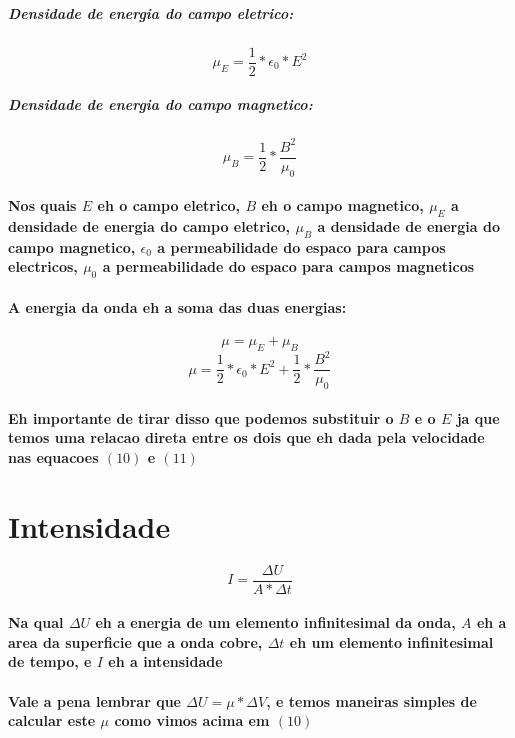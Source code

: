 \documentclass[12pt,twoside, a4paper, twocolumn]{article}
\begin{document}
\subparagraph*{Densidade de energia do campo eletrico:}
\begin{equation}
    \mu_E = \frac{1}{2} * \epsilon_0 * E^2
\end{equation}

\subparagraph*{Densidade de energia do campo magnetico:}
\begin{equation}
    \mu_B = \frac{1}{2} * \frac{B^2}{\mu_0}
\end{equation}

\paragraph{Nos quais $E$ eh o campo eletrico, $B$ eh o campo magnetico, $\mu_E$ a densidade de energia do campo eletrico, $\mu_B$ a densidade de energia do campo magnetico, $\epsilon_0$ a permeabilidade do espaco para campos electricos, $\mu_0$ a permeabilidade do espaco para campos magneticos}
\paragraph{A energia da onda eh a soma das duas energias:}
\begin{equation}
    \mu = \mu_E + \mu_B
\end{equation}
\begin{equation}
    \mu = \frac{1}{2} * \epsilon_0 * E^2 + \frac{1}{2} * \frac{B^2}{\mu_0}
\end{equation}
\paragraph{Eh importante de tirar disso que podemos substituir o $B$ e o $E$ ja que temos uma relacao direta entre os dois que eh dada pela velocidade nas equacoes $(10)$ e $(11)$}

\section*{Intensidade}
\begin{equation}
    I = \frac{\Delta{U}}{A * \Delta{t}}
\end{equation}
\paragraph*{Na qual $\Delta{U}$ eh a energia de um elemento infinitesimal da onda, $A$ eh a area da superficie que a onda cobre, $\Delta{t}$ eh um elemento infinitesimal de tempo, e $I$ eh a intensidade}
\paragraph*{Vale a pena lembrar que $\Delta{U} = \mu * \Delta{V}$, e temos maneiras simples de calcular este $\mu$ como vimos acima em $(10)$}
\end{document}
